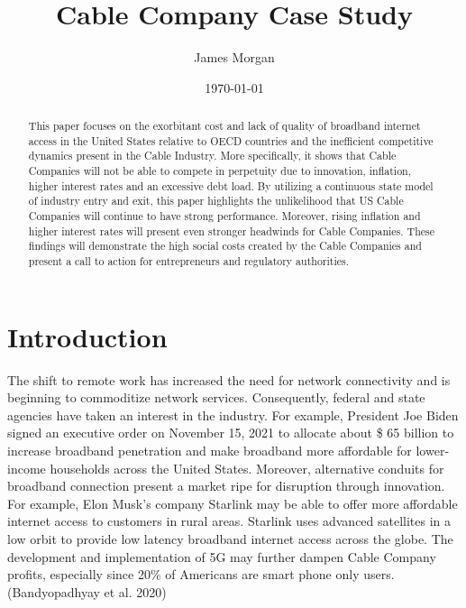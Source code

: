 \documentclass[a4paper,oneside]{article}
\title{Cable Company Case Study}
\author{James Morgan}
\date{\today}
\begin{document}
\maketitle

\begin{singlespacing} %
	\begin{abstract}
		This paper focuses on the exorbitant cost and lack of quality of broadband internet access
		in the United States relative to OECD countries and the inefficient competitive
		dynamics present in the Cable Industry. More specifically, it shows that Cable Companies will
		not be able to compete in perpetuity due to innovation, inflation, higher interest rates and an
		excessive debt load. By utilizing a continuous state model of industry entry and exit, this paper
		highlights the unlikelihood that US Cable Companies will continue to have strong performance.
		Moreover, rising inflation and higher interest rates will present even stronger headwinds for
		Cable Companies. These findings will demonstrate the high social costs created by the Cable
		Companies and present a call to action for entrepreneurs and regulatory authorities.\end{abstract}
	\end{singlespacing}
\pagebreak

\section{Introduction}
	\:\:\:\:\:\: The shift to remote work has increased the need for network connectivity and is
	beginning to commoditize network services. Consequently, federal and state agencies have taken an interest in the industry. 
	For example, President Joe Biden signed an executive order on November 15, 2021 to allocate about \$ 65 billion to increase 
	broadband penetration and make broadband more affordable for lower-income households across the United States. 
	Moreover, alternative conduits for broadband connection present a market ripe for disruption through innovation. For example, Elon Musk's company Starlink may
	be able to offer more affordable internet access to customers in rural areas. Starlink uses
	advanced satellites in a low orbit to provide low latency broadband internet access across the
	globe. The development and implementation of 5G may further dampen Cable Company profits,
	especially since 20\% of Americans are smart phone only users. (Bandyopadhyay et al. 2020)
\end{document}
